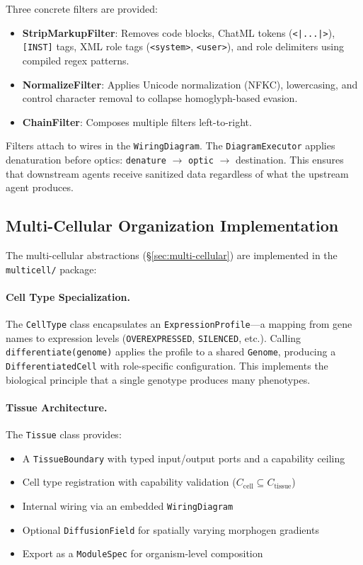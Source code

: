 Three concrete filters are provided:
\begin{itemize}[leftmargin=*]
\item \textbf{StripMarkupFilter}: Removes code blocks, ChatML tokens (\texttt{<|...|>}), \texttt{[INST]} tags, XML role tags (\texttt{<system>}, \texttt{<user>}), and role delimiters using compiled regex patterns.
\item \textbf{NormalizeFilter}: Applies Unicode normalization (NFKC), lowercasing, and control character removal to collapse homoglyph-based evasion.
\item \textbf{ChainFilter}: Composes multiple filters left-to-right.
\end{itemize}

Filters attach to wires in the \texttt{WiringDiagram}. The \texttt{DiagramExecutor} applies denaturation before optics: \texttt{denature} $\to$ \texttt{optic} $\to$ destination. This ensures that downstream agents receive sanitized data regardless of what the upstream agent produces.

\subsection{Multi-Cellular Organization Implementation}

The multi-cellular abstractions (\S\ref{sec:multi-cellular}) are implemented in the \texttt{multicell/} package:

\paragraph{Cell Type Specialization.}
The \texttt{CellType} class encapsulates an \texttt{ExpressionProfile}---a mapping from gene names to expression levels (\texttt{OVEREXPRESSED}, \texttt{SILENCED}, etc.). Calling \texttt{differentiate(genome)} applies the profile to a shared \texttt{Genome}, producing a \texttt{DifferentiatedCell} with role-specific configuration. This implements the biological principle that a single genotype produces many
phenotypes.

\paragraph{Tissue Architecture.}
The \texttt{Tissue} class provides:
\begin{itemize}[leftmargin=*]
\item A \texttt{TissueBoundary} with typed input/output ports and a capability ceiling
\item Cell type registration with capability validation ($C_{\text{cell}} \subseteq C_{\text{tissue}}$)
\item Internal wiring via an embedded \texttt{WiringDiagram}
\item Optional \texttt{DiffusionField} for spatially varying morphogen gradients
\item Export as a \texttt{ModuleSpec} for organism-level composition
\end{itemize}


